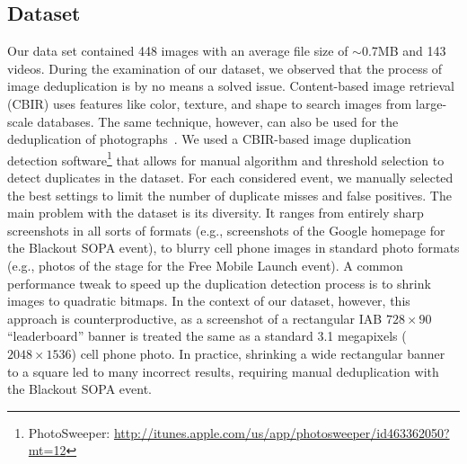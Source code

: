 \documentclass{acm_proc_article-sp}
\newcommand{\inlinelistingsize}{\fontsize{8pt}{11pt}}
\let\oldurl\url
\renewcommand{\url}[1]{\inlinelistingsize\oldurl{#1}}
\begin{document}
\subsection{Dataset} \label{subsec:dataset}
Our data set contained 448 images with an average file size of $\sim$0.7MB and 143 videos.
During the examination of our dataset, we observed that the process of image deduplication is by no means a solved issue.
Content-based image retrieval (CBIR) uses features like color, texture, and shape to search images from large-scale databases.
The same technique, however, can also be used for the deduplication of photographs~\cite{Pattabhi:RAICS11}.
We used a CBIR-based image duplication detection software\footnote{PhotoSweeper: \url{http://itunes.apple.com/us/app/photosweeper/id463362050?mt=12}} that allows for manual algorithm and threshold selection to detect duplicates in the dataset.
For each considered event, we manually selected the best settings to limit the number of duplicate misses and false positives.
The main problem with the dataset is its diversity.
It ranges from entirely sharp screenshots in all sorts of formats (e.g., screenshots of the Google homepage for the Blackout SOPA event), to blurry cell phone images in standard photo formats (e.g., photos of the stage for the Free Mobile Launch event).
A common performance tweak to speed up the duplication detection process is to shrink images to quadratic bitmaps.
In the context of our dataset, however, this approach is counterproductive, as a screenshot of a rectangular IAB $728 \times 90$ ``leaderboard'' banner is treated the same as a standard 3.1 megapixels ($2048 \times 1536$) cell phone photo.
In practice, shrinking a wide rectangular banner to a square led to many incorrect results, requiring manual deduplication with the Blackout SOPA event.
\end{document}
